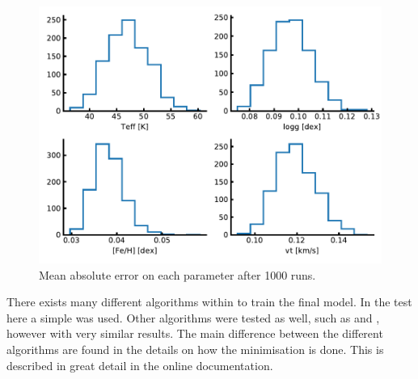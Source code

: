 \begin{figure}[htpb!]
    \centering
    \includegraphics[width=1.0\linewidth]{figures/ML.pdf}
    \caption{Mean absolute error on each parameter after 1000 runs.}
    \label{fig:ml}
\end{figure}

There exists many different algorithms within  to train the final model. In the
test here a simple  was used. Other algorithms were tested as well, such as
 and , however with very similar results. The main difference between the
different algorithms are found in the details on how the minimisation is done. This is described in
great detail in the online documentation.
